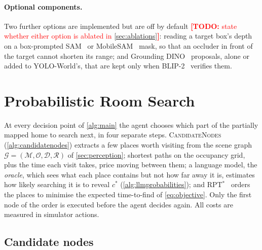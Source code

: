 \documentclass[10pt]{article}
\newcommand{\TODO}[1]{\textcolor{red}{\textbf{[TODO:} #1\textbf{]}}}
\newcommand{\G}{\mathcal{G}}
\newcommand{\M}{\mathcal{M}}
\newcommand{\Ob}{\mathcal{O}}
\newcommand{\D}{\mathcal{D}}
\newcommand{\R}{\mathcal{R}}
\newcommand{\cstar}{c^{*}}
\begin{document}
\paragraph{Optional components.} Two further options are implemented but are off by default
\TODO{state whether either option is ablated in \cref{sec:ablations}}: reading a target box's depth on a box-prompted
SAM~\citep{kirillov2023segment} or MobileSAM~\citep{zhang2023faster} mask, so that an occluder in front of the target
cannot shorten its range; and Grounding DINO~\citep{liu2024grounding} proposals, alone or added to YOLO-World's, that
are kept only when BLIP-2~\citep{li2023blip} verifies them.

\section{Probabilistic Room Search}
\label{sec:planning}

At every decision point of \cref{alg:main} the agent chooses which part of the partially mapped home to search next, in four separate steps. \textsc{CandidateNodes} (\cref{alg:candidatenodes}) extracts a few places worth visiting from the scene graph $\G=(\M,\Ob,\D,\R)$ of \cref{sec:perception}; shortest paths on the occupancy grid, plus the time each visit takes, price moving between them; a language model, the \emph{oracle}, which sees what each place contains but not how far away it is, estimates how likely searching it is to reveal $\cstar$ (\cref{alg:llmprobabilities}); and RPT$^*$~\citep{lyu2026rpt} orders the places to minimise the expected time-to-find of \cref{eq:objective}. Only the first node of the order is executed before the agent decides again. All costs are measured in simulator actions.

\subsection{Candidate nodes}
\label{sec:planning-nodes}
\end{document}
